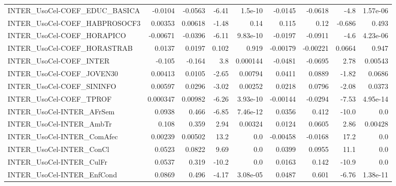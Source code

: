 \begin{tabular}{lrrrrrrrr}
INTER\_UsoCel-COEF\_EDUC\_BASICA          &     -0.0104 &      -0.0563 &    -6.41 &  1.5e-10 &    -0.0145 &     -0.0618 &         -4.8 &      1.57e-06 \\
INTER\_UsoCel-COEF\_HABPROSOCF3          &     0.00353 &      0.00618 &    -1.48 &     0.14 &      0.115 &        0.12 &       -0.686 &         0.493 \\
INTER\_UsoCel-COEF\_HORAPICO             &    -0.00671 &      -0.0396 &    -6.11 & 9.83e-10 &    -0.0197 &     -0.0911 &         -4.6 &      4.23e-06 \\
INTER\_UsoCel-COEF\_HORASTRAB            &      0.0137 &       0.0197 &    0.102 &    0.919 &   -0.00179 &    -0.00221 &       0.0664 &         0.947 \\
INTER\_UsoCel-COEF\_INTER                &      -0.105 &       -0.164 &      3.8 & 0.000144 &    -0.0481 &     -0.0695 &         2.78 &       0.00543 \\
INTER\_UsoCel-COEF\_JOVEN30              &     0.00413 &       0.0105 &    -2.65 &  0.00794 &     0.0411 &      0.0889 &        -1.82 &        0.0686 \\
INTER\_UsoCel-COEF\_SININFO              &     0.00597 &       0.0296 &    -3.02 &  0.00252 &     0.0218 &      0.0796 &        -2.08 &        0.0373 \\
INTER\_UsoCel-COEF\_TPROF                &    0.000347 &      0.00982 &    -6.26 & 3.93e-10 &   -0.00144 &     -0.0294 &        -7.53 &      4.95e-14 \\
INTER\_UsoCel-INTER\_AFrSem              &      0.0938 &        0.466 &    -6.85 & 7.46e-12 &     0.0356 &       0.412 &        -10.0 &           0.0 \\
INTER\_UsoCel-INTER\_AmbTr               &       0.108 &        0.359 &     2.94 &  0.00324 &     0.0124 &      0.0605 &         2.86 &       0.00428 \\
INTER\_UsoCel-INTER\_ComAfec             &     0.00239 &      0.00502 &     13.2 &      0.0 &   -0.00458 &     -0.0168 &         17.2 &           0.0 \\
INTER\_UsoCel-INTER\_ConCl               &      0.0523 &       0.0822 &     9.69 &      0.0 &     0.0399 &      0.0955 &         11.1 &           0.0 \\
INTER\_UsoCel-INTER\_CulFr               &      0.0537 &        0.319 &    -10.2 &      0.0 &     0.0163 &       0.142 &        -10.9 &           0.0 \\
INTER\_UsoCel-INTER\_EnfCond             &      0.0869 &        0.496 &    -4.17 & 3.08e-05 &     0.0487 &       0.601 &        -6.76 &      1.38e-11 \\

\end{tabular}

